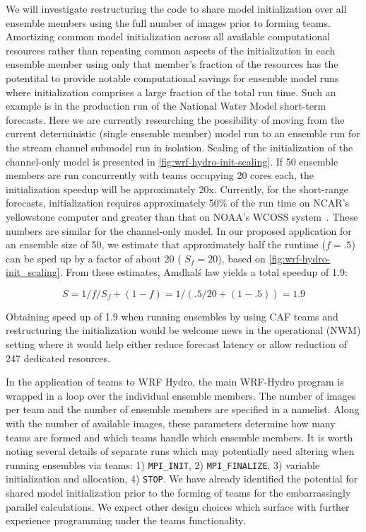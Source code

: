 We will investigate restructuring the code to share model initialization
over all ensemble members using
the full number of images prior to forming teams. Amortizing common
model initialization across all available computational resources
rather than repeating common aspects of the initialization in each
ensemble member using only that member's fraction of the resources has
the potentital to provide notable computational savings for
ensemble model runs where initialization comprises a large fraction of
the total run time. Such an example is in the production run of the
National Water Model short-term forecasts. Here we are currently
researching the possibility of moving from the current deterministic
(single ensemble member) model run to an ensemble run for the stream
channel submodel run in isolation. Scaling of the
initialization of the channel-only model is presented in
\ref{fig:wrf-hydro-init-scaling}. If 50 ensemble members are run concurrently with
teams occupying 20 cores each, the initialization speedup will be
approximately 20x. Currently, for the short-range forecasts,
initialization requires approximately 50\% of the run time on
NCAR's yellowstone computer and greater than that on NOAA's WCOSS
system~\cite{yuetal2017}. These numbers are
similar for the channel-only model. In our proposed application for an ensemble size of 50, we estimate that
approximately half the runtime ($f=.5$) can be sped up by a factor of
about 20 ( $S_f=20$), based on \ref{fig:wrf-hydro-init_scaling}. From
these estimates, Amdhal\'s law yields a total speedup
of 1.9:

\begin{equation}
S = 1 / { f/S_f + (1-f) } = 1 / (.5/20 + (1-.5)) = 1.9
\end{equation}

Obtaining speed up of 1.9 when running ensembles by using CAF
teams and restructuring the initialization would be welcome news in the
operational (NWM) setting where it would help either reduce forecast latency
or allow reduction of 24\/7 dedicated resources.

In the application of teams to WRF Hydro, the main WRF-Hydro program is wrapped in a loop
over the individual ensemble members. The number of images per team and the
 number of ensemble members are specified in a namelist. Along with
 the number of available images, these parameters determine how many
 teams are formed and which teams handle which ensemble members. It is
 worth noting several details of separate runs which may potentially need altering
 when running ensembles via teams: 1) \texttt{MPI\_INIT}, 2) \texttt{MPI\_FINALIZE}, 3)
 variable initialization and allocation, 4) \texttt{STOP}. We have
 already identified the potential for shared model initialization
 prior to the forming of teams for the embarrassingly parallel
 calculations. We expect other design choices which surface with
 further experience programming under the teams functionality.



